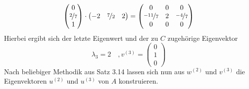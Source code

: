 \begin{egbox}
\[\begin{pmatrix}
            0 \\ \nicefrac{2}{7} \\ 1
        \end{pmatrix} \cdot \begin{pmatrix}
            -2 & \nicefrac{7}{2} & 2
        \end{pmatrix} = \left(\begin{matrix}
            0 & 0 & 0 \\
            \nicefrac{-11}{7} & 2 & \nicefrac{-4}{7} \\
            0 & 0 & 0
        \end{matrix}\right)
    \]
    Hierbei ergibt sich der letzte Eigenwert und der zu $C$ zugehörige Eigenvektor
    \[
        \lambda_3=2 \quad, v^{(3)}=\begin{pmatrix}
            0 \\ 1 \\ 0
        \end{pmatrix}
    \]
    Nach beliebiger Methodik aus Satz 3.14 lassen sich nun aus $w^{(2)}$ und $v^{(3)}$ die Eigenvektoren  $u^{(2)}$
    und $u^{(3)}$ von $A$ konstruieren.
\end{egbox}
